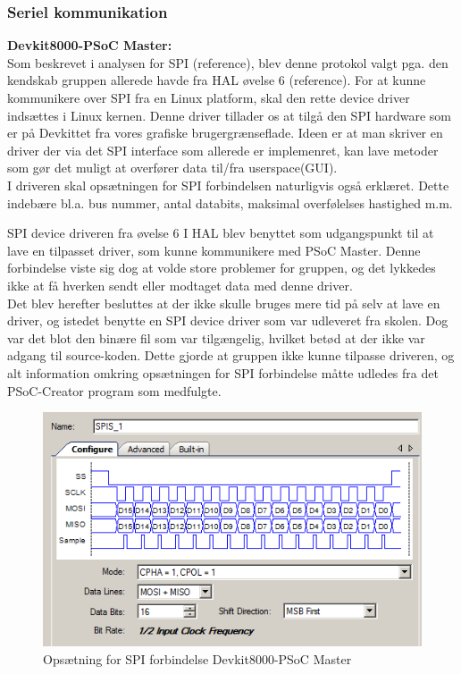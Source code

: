 \subsubsection{Seriel kommunikation}

\textbf{Devkit8000-PSoC Master:} \\

Som beskrevet i analysen for SPI (reference), blev denne protokol valgt pga. den kendskab gruppen allerede havde fra HAL øvelse 6 (reference). 
For at kunne kommunikere over SPI fra en Linux platform, skal den rette device driver indsættes i Linux kernen. Denne driver tillader os at tilgå
den SPI hardware som er på Devkittet fra vores grafiske brugergrænseflade. Ideen er at man skriver en driver der via det SPI interface som allerede er 
implemenret, kan lave metoder som gør det muligt at overfører data til/fra userspace(GUI).\\

I driveren skal opsætningen for SPI forbindelsen naturligvis også erklæret. Dette indebære bl.a. bus nummer, antal databits, maksimal overfølelses hastighed m.m.  
 
SPI device driveren fra øvelse 6 I HAL blev benyttet som udgangspunkt til at lave en tilpasset driver, som kunne kommunikere med PSoC Master. 
Denne forbindelse viste sig dog at volde store problemer for gruppen, og det lykkedes ikke at få hverken sendt eller modtaget data med denne driver.\\

Det blev herefter besluttes at der ikke skulle bruges mere tid på selv at lave en driver, og istedet benytte en SPI device driver som var udleveret fra skolen.
Dog var det blot den binære fil som var tilgængelig, hvilket betød at der ikke var adgang til source-koden. Dette gjorde at gruppen ikke kunne tilpasse driveren,
og alt information omkring opsætningen for SPI forbindelse måtte udledes fra det PSoC-Creator program som medfulgte. 

\begin{figure}[H]
\includegraphics[scale=0.6]{tex/Design/SPI/Clock_mode_SPI}
\caption{Opsætning for SPI forbindelse Devkit8000-PSoC Master}
\end{figure}

